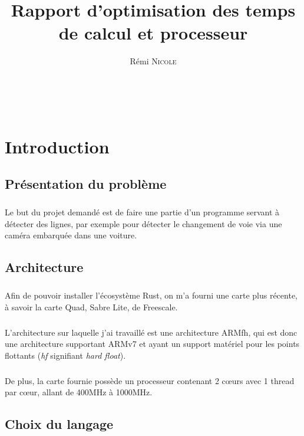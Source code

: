 \documentclass{report}
\author{Rémi \textsc{Nicole}}
\title{Rapport d'optimisation des temps de calcul et processeur}
\begin{document}
\maketitle

~\clearpage

\tableofcontents

\chapter{Introduction}

\section{Présentation du problème}

\paragraph{} Le but du projet demandé est de faire une partie d'un programme
servant à détecter des lignes, par exemple pour détecter le changement de voie
via une caméra embarquée dans une voiture.

\section{Architecture}

\paragraph{} Afin de pouvoir installer l'écosystème Rust, on m'a fourni une
carte plus récente, à savoir la carte Quad, Sabre Lite, de Freescale.

\paragraph{} L'architecture sur laquelle j'ai travaillé est une architecture
ARMfh, qui est donc une architecture supportant ARMv7 et ayant un support
matériel pour les points flottants (\textit{hf} signifiant
\textit{hard float}).

\paragraph{} De plus, la carte fournie possède un processeur contenant 2 cœurs
avec 1 thread par cœur, allant de 400MHz à 1000MHz.

\section{Choix du langage}
\end{document}
